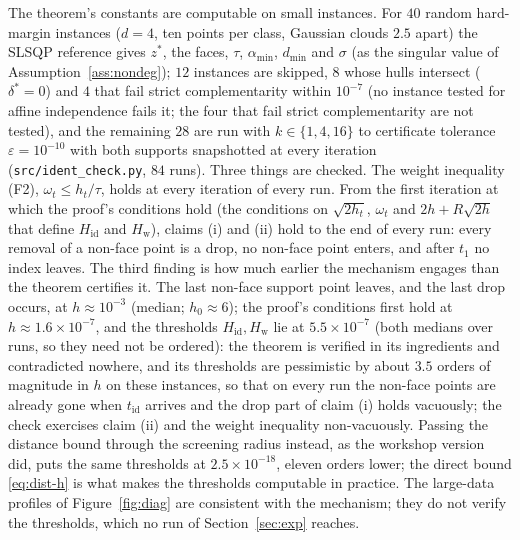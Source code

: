 The theorem's constants are computable on small instances. For $40$
random hard-margin instances ($d=4$, ten points per class, Gaussian
clouds $2.5$ apart) the SLSQP reference gives $z^*$, the faces, $\tau$,
$\alpha_{\min}$, $d_{\min}$ and $\sigma$ (as the singular value of
Assumption~\ref{ass:nondeg}); $12$ instances are skipped, $8$ whose
hulls intersect ($\delta^*=0$) and $4$ that fail strict complementarity
within $10^{-7}$ (no instance tested for affine independence fails it;
the four that fail strict complementarity are not tested), and
the remaining $28$ are run with $k\in\{1,4,16\}$ to certificate tolerance $\varepsilon=10^{-10}$
with both supports snapshotted at every iteration
(\texttt{src/ident\_check.py}, $84$ runs). Three things are checked. The
weight inequality (F2), $\omega_t\le h_t/\tau$, holds at every iteration
of every run. From the first iteration at which the proof's conditions
hold (the conditions on $\sqrt{2h_t}$, $\omega_t$ and $2h+R\sqrt{2h}$
that define $H_{\mathrm{id}}$ and $H_{\mathrm w}$), claims (i) and (ii)
hold to the end of every run: every removal of a non-face point is a
drop, no non-face point enters, and after $t_1$ no index leaves. The
third finding is how much earlier the mechanism engages than the
theorem certifies it. The last non-face support point leaves, and the
last drop occurs, at $h\approx10^{-3}$ (median; $h_0\approx6$); the proof's conditions first hold at $h\approx1.6\times10^{-7}$, and the
thresholds $H_{\mathrm{id}},H_{\mathrm w}$ lie at $5.5\times10^{-7}$ (both
medians over runs, so they need not be ordered):
the theorem is verified in its ingredients and contradicted nowhere,
and its thresholds are pessimistic by about $3.5$ orders of magnitude
in $h$ on these instances, so that on every run the non-face points are already gone when
$t_{\mathrm{id}}$ arrives and the drop part of claim (i) holds vacuously;
the check exercises claim (ii) and the weight inequality non-vacuously. Passing the distance
bound through the screening radius instead, as the workshop version
did, puts the same thresholds at $2.5\times10^{-18}$, eleven orders
lower; the direct bound \eqref{eq:dist-h} is what makes the thresholds
computable in practice. The large-data profiles of Figure~\ref{fig:diag}
are consistent with the mechanism; they do not verify the thresholds,
which no run of Section~\ref{sec:exp} reaches.
